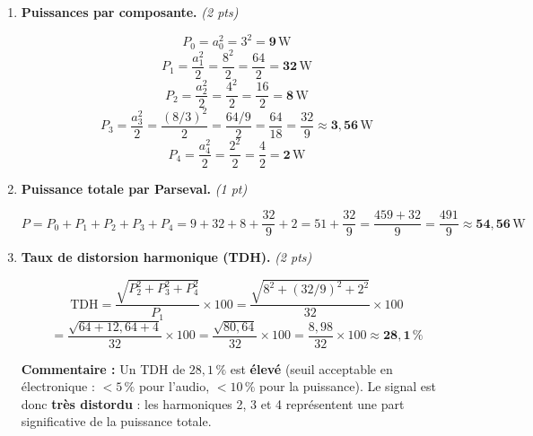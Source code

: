 \documentclass[a4paper,11pt]{article}
\newcommand{\reponse}[1]{\begin{tcolorbox}[reponsebox]#1\end{tcolorbox}}
\begin{document}
\begin{enumerate}[label=\textbf{\arabic*.}, itemsep=0.4cm]
  \reponse{
  \textbf{Barème :} 0,5 pt par raie correctement tracée (hauteur + valeur annotée) pour les 4 harmoniques bleues, + 0,5 pt pour la raie DC déjà fournie reconnue. \textit{La raie DC (rouge) était donnée.}
  }

  \item \textbf{Puissances par composante.} \hfill\textit{(2 pts)}

  \reponse{
  \[
    P_0 = a_0^2 = 3^2 = \mathbf{9\,\mathrm{W}}
  \]
  \[
    P_1 = \frac{a_1^2}{2} = \frac{8^2}{2} = \frac{64}{2} = \mathbf{32\,\mathrm{W}}
  \]
  \[
    P_2 = \frac{a_2^2}{2} = \frac{4^2}{2} = \frac{16}{2} = \mathbf{8\,\mathrm{W}}
  \]
  \[
    P_3 = \frac{a_3^2}{2} = \frac{(8/3)^2}{2} = \frac{64/9}{2} = \frac{64}{18} = \frac{32}{9} \approx \mathbf{3{,}56\,\mathrm{W}}
  \]
  \[
    P_4 = \frac{a_4^2}{2} = \frac{2^2}{2} = \frac{4}{2} = \mathbf{2\,\mathrm{W}}
  \]
  }

  \item \textbf{Puissance totale par Parseval.} \hfill\textit{(1 pt)}

  \reponse{
  \[
    P = P_0 + P_1 + P_2 + P_3 + P_4
    = 9 + 32 + 8 + \frac{32}{9} + 2
    = 51 + \frac{32}{9}
    = \frac{459 + 32}{9}
    = \frac{491}{9}
    \approx \mathbf{54{,}56\,\mathrm{W}}
  \]
  }

  \item \textbf{Taux de distorsion harmonique (TDH).} \hfill\textit{(2 pts)}

  \reponse{
  \[
    \mathrm{TDH}
    = \frac{\sqrt{P_2^2 + P_3^2 + P_4^2}}{P_1} \times 100
    = \frac{\sqrt{8^2 + (32/9)^2 + 2^2}}{32} \times 100
  \]
  \[
    = \frac{\sqrt{64 + 12{,}64 + 4}}{32} \times 100
    = \frac{\sqrt{80{,}64}}{32} \times 100
    = \frac{8{,}98}{32} \times 100
    \approx \mathbf{28{,}1\,\%}
  \]

  \textbf{Commentaire :} Un TDH de $28{,}1\,\%$ est \textbf{élevé} (seuil acceptable en électronique : $< 5\,\%$ pour l'audio, $< 10\,\%$ pour la puissance). Le signal est donc \textbf{très distordu} : les harmoniques 2, 3 et 4 représentent une part significative de la puissance totale.
  }

\end{enumerate}
\end{document}
